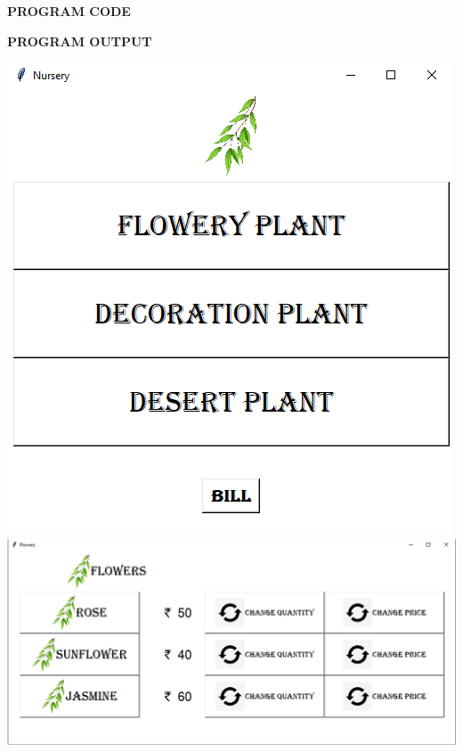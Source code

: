 \documentclass[11pt,a4paper]{article}
\begin{document}
\begin{center}
	\textbf{PROGRAM CODE}
\end{center}


        

\vspace{.5cm}



\pagebreak

\begin{center}
	\textbf{\Large PROGRAM OUTPUT}
\end{center}

\includegraphics{output1.png}\\
\includegraphics[scale = .6]{output2.png}\\
\end{document}
